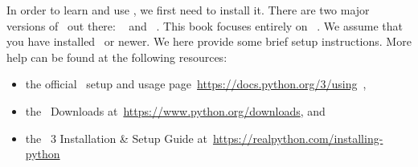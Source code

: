 %
\label{sec:installingPython}%
In order to learn and use \python, we first need to install it.
There are two major versions of \python\ out there: \python~ and \python~.
This book focuses entirely on \python~.
We assume that you have installed \pythonWithVersion\ or newer.
We here provide some brief setup instructions.
More help can be found at the following resources:%
%
\begin{itemize}%
\item the official \python\ setup and usage page~\url{https://docs.python.org/3/using}~\cite{PSF:P3D:PSAU},%
\item the \python\ Downloads at~\url{https://www.python.org/downloads}, and%
\item the \python~3 Installation \& Setup Guide at~\url{https://realpython.com/installing-python}%
\end{itemize}%
%
%
%
%
\endhsection%
%
